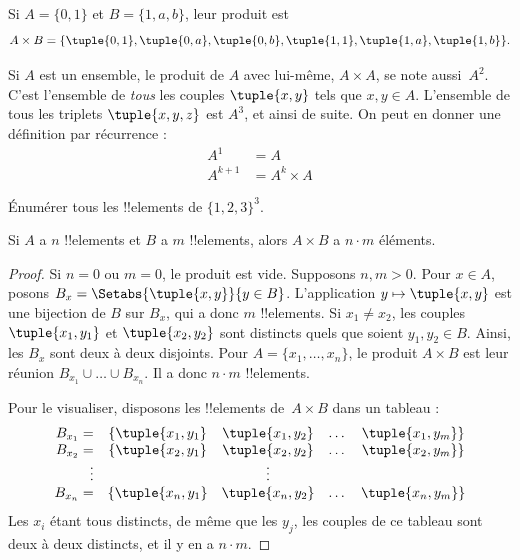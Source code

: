 \documentclass[../../../include/open-logic-section]{subfiles}
\begin{document}
\begin{ex}
Si $A = \{0, 1\}$ et $B = \{1, a, b\}$, leur produit est
\[
A \times B = \{ \tuple{0, 1}, \tuple{0, a}, \tuple{0, b},
    \tuple{1, 1}, \tuple{1, a}, \tuple{1, b} \}.
\]
\end{ex}

\begin{ex}
Si $A$ est un ensemble, le produit de $A$ avec lui-même, $A \times A$,
se note aussi~$A^2$. C'est l'ensemble de \emph{tous} les couples
$\tuple{x, y}$ tels que $x, y \in A$.
L'ensemble de tous les triplets $\tuple{x, y, z}$ est $A^3$,
et ainsi de suite. On peut en donner une définition par récurrence :
\begin{align*}
  A^1 & = A\\
  A^{k+1} & = A^k \times A
\end{align*}
\end{ex}

\begin{prob}
Énumérer tous les !!{element}s de $\{1, 2, 3\}^3$.
\end{prob}

\begin{prop}
Si $A$ a $n$ !!{element}s et $B$ a $m$ !!{element}s, alors
$A \times B$ a $n\cdot m$ éléments.
\end{prop}

\begin{proof}
Si $n=0$ ou $m=0$, le produit est vide. Supposons $n,m>0$.
Pour $x\in A$, posons $B_x = \Setabs{\tuple{x, y}}{y \in B}$.
L'application $y\mapsto \tuple{x,y}$ est une bijection de $B$
sur $B_x$, qui a donc $m$ !!{element}s.
Si $x_1\neq x_2$, les couples $\tuple{x_1,y_1}$ et $\tuple{x_2,y_2}$
sont distincts quels que soient $y_1,y_2\in B$.
Ainsi, les $B_x$ sont deux à deux disjoints. Pour $A=\{x_1,\dots,x_n\}$,
le produit $A \times B$ est leur réunion $B_{x_1} \cup \dots \cup B_{x_n}$.
Il a donc $n\cdot m$ !!{element}s.

Pour le visualiser, disposons les !!{element}s de~$A \times B$
dans un tableau :
\[
\begin{array}{rcccc}
  B_{x_1} = & \{\tuple{x_1, y_1} & \tuple{x_1, y_2} & \dots & \tuple{x_1, y_m}\}\\
  B_{x_2} = & \{\tuple{x_2, y_1} & \tuple{x_2, y_2} & \dots & \tuple{x_2, y_m}\}\\
  \vdots & & \vdots\\
  B_{x_n} = & \{\tuple{x_n, y_1} & \tuple{x_n, y_2} & \dots & \tuple{x_n, y_m}\}
\end{array}
\]
Les $x_i$ étant tous distincts, de même que les $y_j$,
les couples de ce tableau sont deux à deux distincts,
et il y en a $n\cdot m$.
\end{proof}
\end{document}
